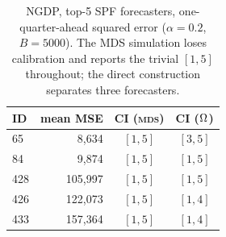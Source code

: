 \begin{table}[htb]
  \centering
  \caption[NGDP rank confidence sets]{NGDP, top-5 SPF forecasters, one-quarter-ahead
  squared error ($\alpha=0.2$, $B=5000$). The MDS simulation loses calibration and
  reports the trivial $[1,5]$ throughout; the direct construction separates three
  forecasters.}
  \label{tab:ngdp}
  \small
  \begin{tabular}{lrcc}
    \toprule
    ID & mean MSE & CI (\textsc{mds}) & CI ($\Omega$)\\
    \midrule
    65  & 8{,}634   & $[1,5]$ & $[3,5]$\\
    84  & 9{,}874   & $[1,5]$ & $[1,5]$\\
    428 & 105{,}997 & $[1,5]$ & $[1,5]$\\
    426 & 122{,}073 & $[1,5]$ & $[1,4]$\\
    433 & 157{,}364 & $[1,5]$ & $[1,4]$\\
    \bottomrule
  \end{tabular}
\end{table}
